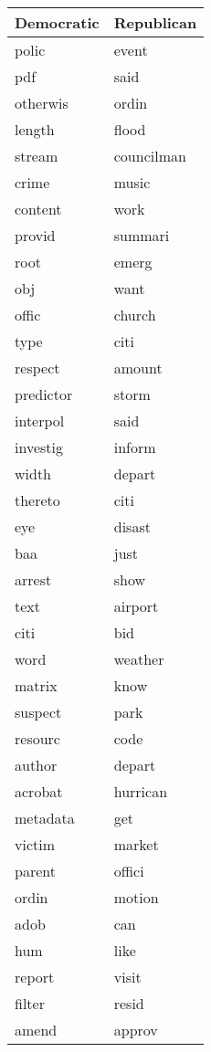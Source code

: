 \begin{table}[ht]
\centering
\begingroup\fontsize{9pt}{10pt}\selectfont
\begin{tabular}{ll}
  \hline
Democratic & Republican \\ 
  \hline
polic & event \\ 
  pdf & said \\ 
  otherwis & ordin \\ 
  length & flood \\ 
  stream & councilman \\ 
  crime & music \\ 
  content & work \\ 
  provid & summari \\ 
  root & emerg \\ 
  obj & want \\ 
  offic & church \\ 
  type & citi \\ 
  respect & amount \\ 
  predictor & storm \\ 
  interpol & said \\ 
  investig & inform \\ 
  width & depart \\ 
  thereto & citi \\ 
  eye & disast \\ 
  baa & just \\ 
  arrest & show \\ 
  text & airport \\ 
  citi & bid \\ 
  word & weather \\ 
  matrix & know \\ 
  suspect & park \\ 
  resourc & code \\ 
  author & depart \\ 
  acrobat & hurrican \\ 
  metadata & get \\ 
  victim & market \\ 
  parent & offici \\ 
  ordin & motion \\ 
  adob & can \\ 
  hum & like \\ 
  report & visit \\ 
  filter & resid \\ 
  amend & approv \\ 

\end{tabular}
\end{table}
